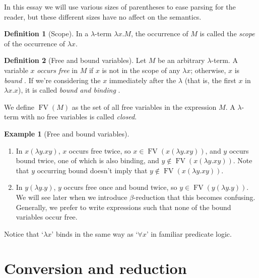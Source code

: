 \documentclass[a4paper, 11pt]{article}
\theoremstyle{plain}
\theoremstyle{definition}
\newtheorem{defn}{Definition}[section]
\newtheorem{example}{Example}[section]
\theoremstyle{remark}
\newcommand\FV{\operatorname{FV}}
\begin{document}
In this essay we will use various sizes of parentheses to ease parsing for the reader, but these different sizes have no affect on the semantics.

\begin{defn}[Scope]\label{def:scope}
In a $\lambda$-term $\lambda x . M$, the occurrence of $M$ is called the \textit{scope} of the occurrence of $\lambda x$.
\end{defn}

\begin{defn}[Free and bound variables]\label{def:free-and-bound-variables}
Let $M$ be an arbitrary $\lambda$-term. A variable $x$ \textit{occurs free} in $M$ if $x$ is not in the scope of any $\lambda x$; otherwise, $x$ is \textit{bound} \parencite[p.~24]{barendregt-1981-lambda-calculus}. If we're considering the $x$ immediately after the $\lambda$ (that is, the first $x$ in $\lambda x . x$), it is called \textit{bound and binding} \parencite[p.~6--7]{hindley-seldin-2008-lambda-calculus-and-combinators}.

We define $\FV(M)$ as the set of all free variables in the expression $M$. A $\lambda$-term with no free variables is called \textit{closed}.
\end{defn}

\begin{example}[Free and bound variables]\label{ex:free-and-bound-variables}\leavevmode
\begin{enumerate}[(1)]
\item In $x (\lambda y . xy)$, $x$ occurs free twice, so $x \in \FV(x (\lambda y . xy))$, and $y$ occurs bound twice, one of which is also binding, and $y \notin \FV(x (\lambda y . xy))$. Note that $y$ occurring bound doesn't imply that $y \notin \FV(x (\lambda y . xy))$.

\item In $y (\lambda y . y)$, $y$ occurs free once and bound twice, so $y \in \FV(y (\lambda y . y))$. We will see later when we introduce $\beta$-reduction that this becomes confusing. Generally, we prefer to write expressions such that none of the bound variables occur free.
\end{enumerate}
Notice that `$\lambda x$' binds in the same way as `$\forall x$' in familiar predicate logic.
\end{example}



\section{Conversion and reduction}\label{sec:conversion-and-reduction}
\end{document}
